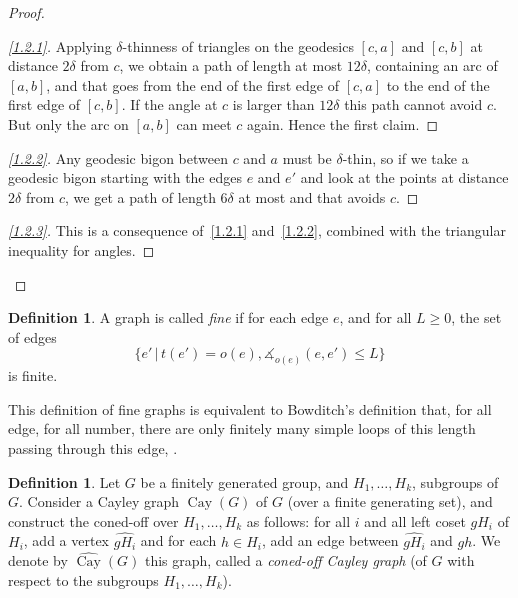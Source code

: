 \documentclass[11pt]{article}
\theoremstyle{definition}
\newtheorem{defi}[theo]{Definition}
\numberwithin{equation}{section}
\DeclareMathOperator{\Cay}{Cay}
\newcommand{\A}{\measuredangle}
\newenvironment*{step}{\begin{proof}}{\let\qed\relax\end{proof}}
\newenvironment*{laststep}{\begin{proof}}{\end{proof}}
\begin{document}
\begin{proof}
\begin{step}[\eqref{1.2.1}]
Applying $\delta$-thinness of triangles on the
geodesics $[c,a]$ and $[c, b]$ at distance $2\delta$ from $c$, we obtain a path of length at most $12\delta$, containing an arc of $[a,b]$, and that goes from the end of the first edge of $[c,a]$ to the end of the first edge of $[c,b]$. If the angle at $c$ is larger than $12\delta$ this path cannot avoid $c$. But only the arc on $[a,b]$ can meet $c$ again. Hence the first claim.
\end{step}

\begin{step}[\eqref{1.2.2}]
Any geodesic bigon between $c$ and $a$ must be $\delta$-thin, so if we take a geodesic bigon starting with the edges $e$ and $e'$ and look at the points at distance $2\delta$ from $c$, we get a path of length $6\delta$ at most and that avoids $c$.
\end{step}

\begin{laststep}[\eqref{1.2.3}]
This is a consequence of~\eqref{1.2.1} and~\eqref{1.2.2}, combined with the triangular inequality for angles.
\end{laststep}
\let\qed\relax
\end{proof}

\begin{defi}
A graph is called \emph{fine} if for each edge $e$, and for all $L\geq 0$, the set of edges
\[
\{ e'\,|\,t(e')=o(e), \A_{o(e)}(e, e') \leq L\}
\]
is finite.
\end{defi}

This definition of fine graphs is equivalent to Bowditch's definition that, for all edge, for all number, there are only finitely many simple loops of this length passing through this edge, \cite{BowRH}.


\begin{defi}
Let $G$ be a finitely generated group, and $H_1, \dots, H_k$,
subgroups of $G$. Consider a Cayley graph $\Cay(G)$ of $G$ (over a finite generating set), and construct the coned-off over $H_1, \dots, H_k$ as follows: for all $i$ and all left coset $gH_i$ of $H_i$, add a vertex $\widehat{gH_i}$ and for each $h\in H_i$, add an edge between $\widehat{gH_i}$ and $gh$. We denote by $\widehat{{\Cay}} (G)$ this graph, called a \emph{coned-off Cayley graph} (of $G$ with respect to the subgroups $H_1, \dots, H_k$).
\end{defi}
\end{document}
